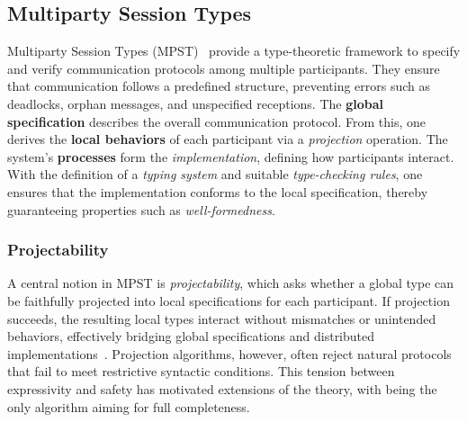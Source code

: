 
\subsection{Multiparty Session Types}
Multiparty Session Types (MPST)~\cite{honda2008multiparty} 
provide a type-theoretic framework to specify and verify communication 
protocols among multiple participants. They ensure that communication 
follows a predefined structure, preventing errors such as deadlocks, 
orphan messages, and unspecified receptions. The 
\textbf{global specification} describes the overall communication 
protocol. From this, one derives the \textbf{local behaviors} of each 
participant via a \emph{projection} operation. The system's 
\textbf{processes} form the \emph{implementation}, defining how 
participants interact. With the definition of a \emph{typing system} 
and suitable \emph{type-checking rules}, one ensures that the 
implementation conforms to the local specification, thereby 
guaranteeing properties such as \emph{well-formedness}.  


\subsubsection{Projectability}
A central notion in MPST is \emph{projectability}, which asks whether 
a global type can be faithfully projected into local specifications for 
each participant. If projection succeeds, the resulting local types 
interact without mismatches or unintended behaviors, effectively 
bridging global specifications and distributed implementations~\cite{honda2008multiparty}.  
Projection algorithms, however, often reject natural protocols that 
fail to meet restrictive syntactic conditions. This tension between 
expressivity and safety has motivated extensions of the theory, with 
\cite{castagna2012global} being the only algorithm aiming for full 
completeness.


